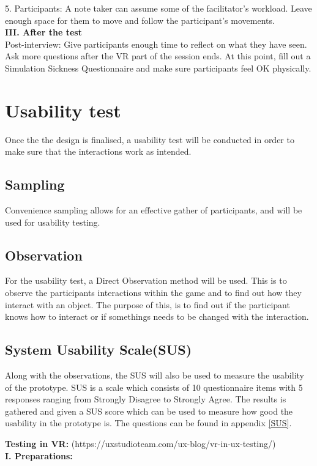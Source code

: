     5. Participants: A note taker can assume some of the facilitator’s workload. Leave enough space for them to move and follow the participant’s movements.\\
    
    \textbf{III. After the test}\\
    Post-interview: Give participants enough time to reflect on what they have seen. Ask more questions after the VR part of the session ends. At this point, fill out a Simulation Sickness Questionnaire and make sure participants feel OK physically.
    
    \section{Usability test}
    Once the the design is finalised, a usability test will be conducted in order to make sure that the interactions work as intended.
    
    \subsection{Sampling}
    Convenience sampling allows for an effective gather of participants, and will be used for usability testing\cite{bjoernerBog}.   
    
    \subsection{Observation}
    For the usability test, a Direct Observation method will be used\cite{bjoernerBog}. This is to observe the participants interactions within the game and to find out how they interact with an object. The purpose of this, is to find out if the participant knows how to interact or if somethings needs to be changed with the interaction.
    
    \subsection{System Usability Scale(SUS)}
    Along with the observations, the SUS will also be used to measure the usability of the prototype. SUS is a scale which consists of 10 questionnaire items with 5 responses ranging from Strongly Disagree to Strongly Agree. The results is gathered and given a SUS score which can be used to measure how good the usability in the prototype is\cite{SUS}. The questions can be found in appendix \ref{SUS}.
    
\textbf{Testing in VR:}
    (https://uxstudioteam.com/ux-blog/vr-in-ux-testing/)\\
    \textbf{I. Preparations:}\\
   
